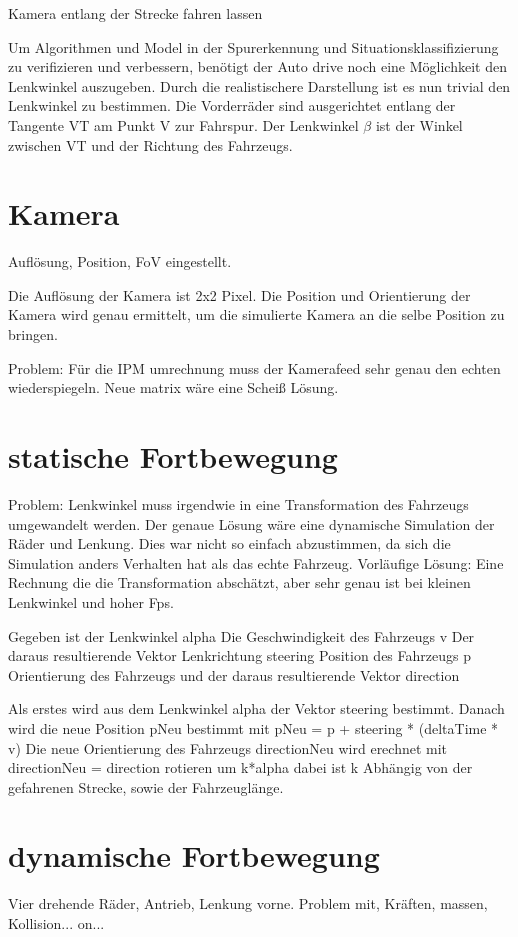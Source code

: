 Kamera entlang der Strecke fahren lassen

Um Algorithmen und Model in der Spurerkennung und Situationsklassifizierung zu verifizieren und verbessern, 
benötigt der Auto drive noch eine Möglichkeit den Lenkwinkel auszugeben.
Durch die realistischere Darstellung ist es nun trivial den Lenkwinkel zu bestimmen.
Die Vorderräder sind ausgerichtet entlang der Tangente VT am Punkt V zur Fahrspur.
Der Lenkwinkel $\beta$ ist der Winkel zwischen VT und der Richtung des Fahrzeugs. 


\section{Kamera}
Auflösung, Position, FoV eingestellt.

Die Auflösung der Kamera ist 2x2 Pixel.
Die Position und Orientierung der Kamera wird genau ermittelt, um die simulierte Kamera an die selbe Position zu bringen.
 

Problem: Für die IPM umrechnung muss der Kamerafeed sehr genau den echten wiederspiegeln.
Neue matrix wäre eine Scheiß Lösung.


\section{statische Fortbewegung}
Problem: Lenkwinkel muss irgendwie in eine Transformation des Fahrzeugs umgewandelt werden.
Der genaue Lösung wäre eine dynamische Simulation der Räder und Lenkung.
Dies war nicht so einfach abzustimmen, da sich die Simulation anders Verhalten hat als das echte Fahrzeug.
Vorläufige Lösung: Eine Rechnung die die Transformation abschätzt, aber sehr genau ist bei kleinen Lenkwinkel und hoher Fps.

Gegeben ist der Lenkwinkel alpha
Die Geschwindigkeit des Fahrzeugs v
Der daraus resultierende Vektor Lenkrichtung steering
Position des Fahrzeugs p
Orientierung des Fahrzeugs und der daraus resultierende Vektor direction

Als erstes wird aus dem Lenkwinkel alpha der Vektor steering bestimmt.
Danach wird die neue Position pNeu bestimmt mit pNeu = p + steering * (deltaTime * v)
Die neue Orientierung des Fahrzeugs directionNeu wird erechnet mit directionNeu = direction rotieren um k*alpha
dabei ist k Abhängig von der gefahrenen Strecke, sowie der Fahrzeuglänge.

\section{dynamische Fortbewegung}
Vier drehende Räder, Antrieb, Lenkung vorne.
Problem mit, Kräften, massen, Kollision...
on...

